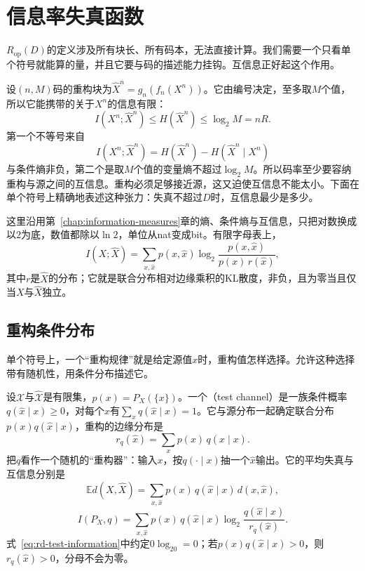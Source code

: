 \section{信息率失真函数}
\label{sec:rd-information-rd}

$R_{\mathrm{op}}(D)$的定义涉及所有块长、所有码本，无法直接计算。我们需要一个只看单个符号就能算的量，并且它要与码的描述能力挂钩。互信息正好起这个作用。

设$(n,M)$码的重构块为$\hat{X}^{n}=g_n(f_n(X^{n}))$。它由编号决定，至多取$M$个值，所以它能携带的关于$X^{n}$的信息有限：
\[
  I(X^{n};\hat{X}^{n})\leq H(\hat{X}^{n})\leq\log_2M=nR .
\]
第一个不等号来自
\[
  I(X^{n};\hat{X}^{n})=H(\hat{X}^{n})-H(\hat{X}^{n}\mid X^{n})
\]
与条件熵非负，第二个是取$M$个值的变量熵不超过$\log_2M$。所以码率至少要容纳重构与源之间的互信息。重构必须足够接近源，这又迫使互信息不能太小。下面在单个符号上精确地表述这种张力：失真不超过$D$时，互信息最少是多少。

这里沿用第~\ref{chap:information-measures}章的熵、条件熵与互信息，只把对数换成以$2$为底，数值都除以$\ln2$，单位从nat变成bit。有限字母表上，
\[
  I(X;\hat{X})=\sum_{x,\hat{x}}p(x,\hat{x})\log_2\frac{p(x,\hat{x})}{p(x)\,r(\hat{x})},
\]
其中$r$是$\hat{X}$的分布；它就是联合分布相对边缘乘积的KL散度，非负，且为零当且仅当$X$与$\hat{X}$独立。

\subsection{重构条件分布}
\label{sec:rd-test-channels}

单个符号上，一个“重构规律”就是给定源值$x$时，重构值怎样选择。允许这种选择带有随机性，用条件分布描述它。

设$\mathcal{X}$与$\hat{\mathcal{X}}$是有限集，$p(x)=P_X(\{x\})$。一个（test channel）是一族条件概率$q(\hat{x}\mid x)\geq0$，对每个$x$有$\sum_{\hat{x}}q(\hat{x}\mid x)=1$。它与源分布一起确定联合分布$p(x)q(\hat{x}\mid x)$，重构的边缘分布是
\begin{equation}
  r_q(\hat{x})=\sum_{x}p(x)\,q(\hat{x}\mid x).
  \label{eq:rd-output-marginal}
\end{equation}
把$q$看作一个随机的“重构器”：输入$x$，按$q(\cdot\mid x)$抽一个$\hat{x}$输出。它的平均失真与互信息分别是
\begin{equation}
  \mathbb{E}d(X,\hat{X})=\sum_{x,\hat{x}}p(x)\,q(\hat{x}\mid x)\,d(x,\hat{x}),
  \label{eq:rd-test-distortion}
\end{equation}
\begin{equation}
  I(P_X,q)=\sum_{x,\hat{x}}p(x)\,q(\hat{x}\mid x)\log_2\frac{q(\hat{x}\mid x)}{r_q(\hat{x})}.
  \label{eq:rd-test-information}
\end{equation}
式~\eqref{eq:rd-test-information}中约定$0\log_20=0$；若$p(x)q(\hat{x}\mid x)>0$，则$r_q(\hat{x})>0$，分母不会为零。

